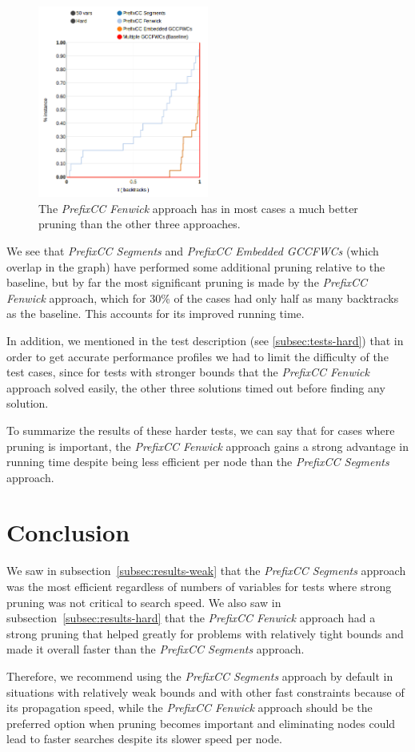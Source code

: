 \documentclass[a4paper,10pt]{article}
\begin{document}
\begin{figure}
    \centering
    \includegraphics[width=0.5\textwidth]{img/hard25-50vars-backtracks}
    \caption{The \emph{PrefixCC Fenwick} approach has in most cases a much better pruning than the other three approaches.}
    \label{fig:hard-backtracks}
\end{figure}

We see that \emph{PrefixCC Segments} and \emph{PrefixCC Embedded GCCFWCs} (which overlap in the graph) have performed some additional pruning relative to the baseline, but by far the most significant pruning is made by the \emph{PrefixCC Fenwick} approach, which for 30\% of the cases had only half as many backtracks as the baseline. This accounts for its improved running time.

In addition, we mentioned in the test description (see \ref{subsec:tests-hard}) that in order to get accurate performance profiles we had to limit the difficulty of the test cases, since for tests with stronger bounds that the \emph{PrefixCC Fenwick} approach solved easily, the other three solutions timed out before finding any solution.

To summarize the results of these harder tests, we can say that for cases where pruning is important, the \emph{PrefixCC Fenwick} approach gains a strong advantage in running time despite being less efficient per node than the \emph{PrefixCC Segments} approach.

\section{Conclusion}

We saw in subsection~\ref{subsec:results-weak} that the \emph{PrefixCC Segments} approach was the most efficient regardless of numbers of variables for tests where strong pruning was not critical to search speed. We also saw in subsection~\ref{subsec:results-hard} that the \emph{PrefixCC Fenwick} approach had a strong pruning that helped greatly for problems with relatively tight bounds and made it overall faster than the \emph{PrefixCC Segments} approach.

Therefore, we recommend using the \emph{PrefixCC Segments} approach by default in situations with relatively weak bounds and with other fast constraints because of its propagation speed, while the \emph{PrefixCC Fenwick} approach should be the preferred option when pruning becomes important and eliminating nodes could lead to faster searches despite its slower speed per node.
\end{document}
